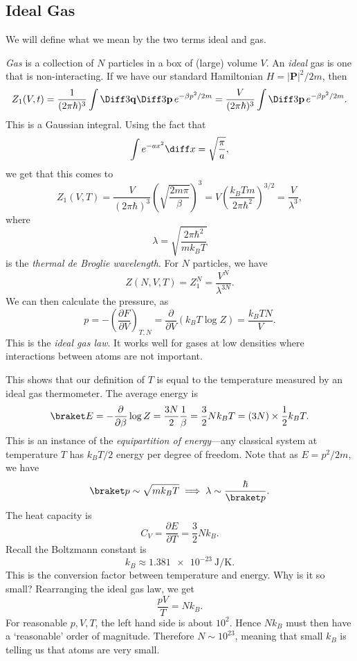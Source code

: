 \documentclass[12pt]{article}
\begin{document}
\subsection{Ideal Gas}
\label{sub:id_gas}

We will define what we mean by the two terms ideal and gas.

\emph{Gas} is a collection of $N$ particles in a box of (large) volume $V$. An \emph{ideal} gas is one that is non-interacting. If we have our standard Hamiltonian $H = |\mathbf{P}|^2/2m$, then
\[
Z_1(V, t) = \frac{1}{(2 \pi \hbar)^3} \int \Diff3 \mathbf{q} \Diff3 \mathbf{p} \, e^{-\beta p^2/2m} = \frac{V}{(2 \pi \hbar)^3} \int \Diff3 \mathbf{p}  \, e^{-\beta p^2/2m}.
\]
This is a Gaussian integral. Using the fact that
\[
	\int e^{-ax^2}\diff x = \sqrt{\frac{\pi}{a}},
\]
we get that this comes to
\[
	Z_1(V, T) = \frac{V}{(2 \pi \hbar)^3} \left( \sqrt{\frac{2 m \pi}{\beta} } \right)^3 = V \left( \frac{k_B T m}{2 \pi \hbar^2} \right)^{3/2} = \frac{V}{\lambda^3},
\]
where
\[
	\lambda = \sqrt{\frac{2 \pi \hbar^2}{m k_B T}}
\]
is the \emph{thermal de Broglie wavelength}. For $N$ particles, we have
\[
Z(N, V, T) = Z_1^N = \frac{V^N}{\lambda^{3N}}.
\]
We can then calculate the pressure, as
\[
p = - \left( \frac{\partial F}{\partial V}\right)_{T, N} = \frac{\partial}{\partial V} (k_B T \log Z) = \frac{k_B T N}{V}.
\]
This is the \emph{ideal gas law}. It works well for gases at low densities where interactions between atoms are not important.

This shows that our definition of $T$ is equal to the temperature measured by an ideal gas thermometer. The average energy is
\[
\braket E = - \frac{\partial}{\partial \beta} \log Z = \frac{3N}{2} \frac{1}{\beta} = \frac{3}{2} N k_B T = (3N) \times \frac{1}{2} k_B T.
\]
This is an instance of the \emph{equipartition of energy}---any classical system at temperature $T$ has $k_BT/2$ energy per degree of freedom. Note that as $E = p^2/2m$, we have
\[
	\braket p \sim \sqrt{m k_B T} \implies \lambda \sim \frac{\hbar}{\braket p}.
\]
The heat capacity is
\[
C_V = \frac{\partial E}{\partial T} = \frac{3}{2} N k_B.
\]
Recall the Boltzmann constant is
\[
	k_B \approx \qty{1.381e-23}{\joule\per\kelvin}.
\]
This is the conversion factor between temperature and energy. Why is it so small? Rearranging the ideal gas law, we get
\[
\frac{pV}{T} = N k_B.
\]
For reasonable $p, V, T$, the left hand side is about $10^2$. Hence $N k_B$ must then have a `reasonable' order of magnitude. Therefore $N \sim 10^{23}$, meaning that small $k_B$ is telling us that atoms are very small.
\end{document}
